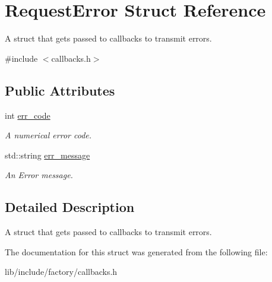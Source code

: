 \hypertarget{structRequestError}{\section{Request\-Error Struct Reference}
\label{structRequestError}
}


A struct that gets passed to callbacks to transmit errors.  




{\ttfamily \#include $<$callbacks.\-h$>$}

\subsection*{Public Attributes}
\begin{DoxyCompactItemize}
\item 
\hypertarget{structRequestError_abb80687d9ab9393139a6591b71248f4f}{int \hyperlink{structRequestError_abb80687d9ab9393139a6591b71248f4f}{err\-\_\-code}}\label{structRequestError_abb80687d9ab9393139a6591b71248f4f}

\begin{DoxyCompactList}\small\item\em A numerical error code. \end{DoxyCompactList}\item 
\hypertarget{structRequestError_a6d14b796dda607dfd6e0c6736f9dec96}{std\-::string \hyperlink{structRequestError_a6d14b796dda607dfd6e0c6736f9dec96}{err\-\_\-message}}\label{structRequestError_a6d14b796dda607dfd6e0c6736f9dec96}

\begin{DoxyCompactList}\small\item\em An Error message. \end{DoxyCompactList}\end{DoxyCompactItemize}


\subsection{Detailed Description}
A struct that gets passed to callbacks to transmit errors. 

The documentation for this struct was generated from the following file\-:\begin{DoxyCompactItemize}
\item 
lib/include/factory/callbacks.\-h\end{DoxyCompactItemize}
